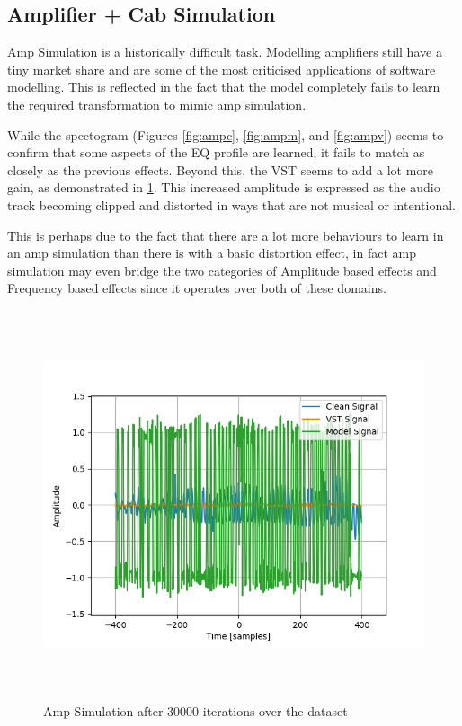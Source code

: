 \documentclass{l4proj}
\begin{document}
\subsection{Amplifier + Cab Simulation}\label{amplifier-cab-simulation}

Amp Simulation is a historically difficult task. Modelling amplifiers
still have a tiny market share and are some of the most criticised
applications of software modelling. This is reflected in the fact that
the model completely fails to learn the required transformation to mimic
amp simulation.

While the spectogram (Figures \ref{fig:ampc}, \ref{fig:ampm}, and
\ref{fig:ampv}) seems to confirm that some aspects of the EQ profile are
learned, it fails to match as closely as the previous effects. Beyond
this, the VST seems to add a lot more gain, as demonstrated in
\ref{fig:ampsim}. This increased amplitude is expressed as the audio
track becoming clipped and distorted in ways that are not musical or
intentional.

This is perhaps due to the fact that there are a lot more behaviours to
learn in an amp simulation than there is with a basic distortion effect,
in fact amp simulation may even bridge the two categories of Amplitude
based effects and Frequency based effects since it operates over both of
these domains.

\begin{figure}
\centering
\includegraphics[width=6.00000in,height=4.50000in]{images/ampsim.png}
\caption{Amp Simulation after 30000 iterations over the
dataset\label{fig:ampsim}}
\end{figure}
\end{document}

